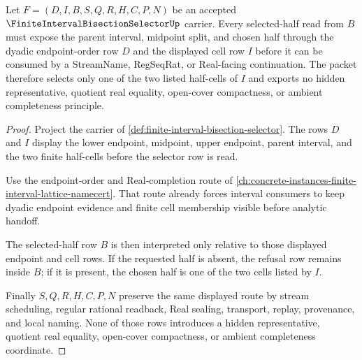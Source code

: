 \begin{theorem}
\label{thm:finite-interval-bisection-selected-half-exactness}
Let $F=(D,I,B,S,Q,R,H,C,P,N)$ be an accepted $\FiniteIntervalBisectionSelectorUp$ carrier. Every selected-half read from $B$ must expose the parent interval, midpoint split, and chosen half through the dyadic endpoint-order row $D$ and the displayed cell row $I$ before it can be consumed by a StreamName, RegSeqRat, or Real-facing continuation. The packet therefore selects only one of the two listed half-cells of $I$ and exports no hidden representative, quotient real equality, open-cover compactness, or ambient completeness principle.
\end{theorem}
\begin{proof}
Project the carrier of \autoref{def:finite-interval-bisection-selector}. The rows $D$ and $I$ display the lower endpoint, midpoint, upper endpoint, parent interval, and the two finite half-cells before the selector row is read.

Use the endpoint-order and Real-completion route of \autoref{ch:concrete-instances-finite-interval-lattice-namecert}. That route already forces interval consumers to keep dyadic endpoint evidence and finite cell membership visible before analytic handoff.

The selected-half row $B$ is then interpreted only relative to those displayed endpoint and cell rows. If the requested half is absent, the refusal row remains inside $B$; if it is present, the chosen half is one of the two cells listed by $I$.

Finally $S,Q,R,H,C,P,N$ preserve the same displayed route by stream scheduling, regular rational readback, Real sealing, transport, replay, provenance, and local naming. None of those rows introduces a hidden representative, quotient real equality, open-cover compactness, or ambient completeness coordinate.
\end{proof}

